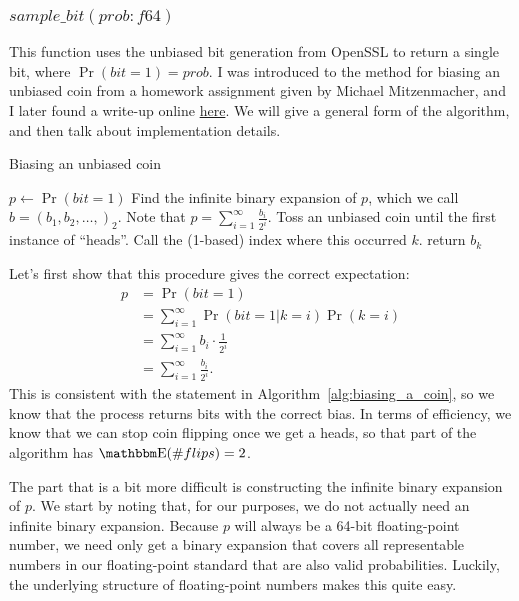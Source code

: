 \documentclass[11pt]{scrartcl} %
\begin{document}
\subsubsection{$sample\_bit(prob: f64)$}
This function uses the unbiased bit generation from OpenSSL to return a single bit, where $\Pr(bit = 1) = prob$.
I was introduced to the method for biasing an unbiased coin from a homework assignment given by Michael Mitzenmacher,
and I later found a write-up online \href{https://amakelov.wordpress.com/2013/10/10/arbitrarily-biasing-a-coin-in-2-expected-tosses/}{here}.
We will give a general form of the algorithm, and then talk about implementation details.
\begin{algorithm}[H]
	\caption{Biasing an unbiased coin}
	\label{alg:biasing_a_coin}
	\begin{algorithmic}[1]
		\State $p \gets \Pr(bit = 1)$
		\State Find the infinite binary expansion of $p$, which we call $b = (b_1, b_2, \hdots,)_2$.
		Note that $p = \sum_{i=1}^{\infty}\frac{b_i}{2^i}$.
		\State Toss an unbiased coin until the first instance of ``heads''. Call the (1-based) index where this occurred $k$.
		\State return $b_k$
	\end{algorithmic}
\end{algorithm}
Let's first show that this procedure gives the correct expectation:
\begin{align*}
	p &= \Pr(bit = 1) \\
		 &= \sum_{i=1}^{\infty} \Pr(bit = 1 \vert k = i) \Pr(k = i) \\
		 &= \sum_{i=1}^{\infty} b_i \cdot \frac{1}{2^i} \\
		 &= \sum_{i=1}^{\infty}\frac{b_i}{2^i}.
\end{align*}
This is consistent with the statement in Algorithm~\ref{alg:biasing_a_coin}, so we know that
the process returns bits with the correct bias.
In terms of efficiency, we know that we can stop coin flipping once we get a heads,
so that part of the algorithm has $\E(\# flips) = 2$. \newline

The part that is a bit more difficult is constructing the infinite binary expansion of $p$.
We start by noting that, for our purposes, we do not actually need an infinite binary expansion.
Because $p$ will always be a 64-bit floating-point number, we need only get a binary
expansion that covers all representable numbers in our floating-point standard that are
also valid probabilities.
Luckily, the underlying structure of floating-point numbers makes this quite easy. \newline
\end{document}
